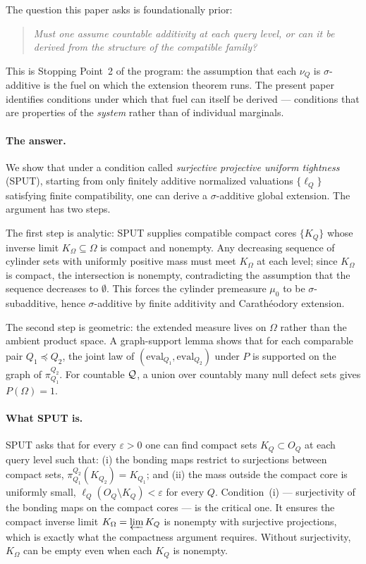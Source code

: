 The question this paper asks is foundationally prior:

\begin{quote}
\emph{Must one assume countable additivity at each query level, or
can it be derived from the structure of the compatible family?}
\end{quote}

This is Stopping Point~2 of the program: the assumption that each
$\nu_Q$ is $\sigma$-additive is the fuel on which the extension
theorem runs.  The present paper identifies conditions under which
that fuel can itself be derived --- conditions that are properties
of the \emph{system} rather than of individual marginals.

\paragraph{The answer.}
We show that under a condition called \emph{surjective projective
uniform tightness} (SPUT), starting from only finitely additive
normalized valuations $\{\ell_Q\}$ satisfying finite compatibility,
one can derive a $\sigma$-additive global extension.  The argument has
two steps.

The first step is analytic: SPUT supplies compatible compact cores
$\{K_Q\}$ whose inverse limit $K_\Omega \subseteq \Omega$ is compact
and nonempty.  Any decreasing sequence of cylinder sets with uniformly
positive mass must meet $K_\Omega$ at each level; since
$K_\Omega$ is compact, the intersection is nonempty, contradicting
the assumption that the sequence decreases to $\emptyset$.  This
forces the cylinder premeasure $\mu_0$ to be $\sigma$-subadditive,
hence $\sigma$-additive by finite additivity and Carath\'eodory
extension.

The second step is geometric: the extended measure lives on $\Omega$
rather than the ambient product space.  A graph-support lemma shows
that for each comparable pair $Q_1 \preceq Q_2$, the joint law of
$(\mathrm{eval}_{Q_1}, \mathrm{eval}_{Q_2})$ under $P$ is
supported on the graph of $\pi^{Q_2}_{Q_1}$.  For countable
$\mathcal{Q}$, a union over countably many null defect sets gives
$P(\Omega) = 1$.

\paragraph{What SPUT is.}
SPUT asks that for every $\varepsilon > 0$ one can find compact sets
$K_Q \subset O_Q$ at each query level such that: (i) the
bonding maps restrict to surjections between compact sets,
$\pi^{Q_2}_{Q_1}(K_{Q_2}) = K_{Q_1}$; and (ii) the mass outside
the compact core is uniformly small, $\ell_Q(O_Q \setminus K_Q) <
\varepsilon$ for every $Q$.  Condition~(i) --- surjectivity of the
bonding maps on the compact cores --- is the critical one.  It ensures
the compact inverse limit $K_\Omega = \varprojlim K_Q$ is nonempty
with surjective projections, which is exactly what the compactness
argument requires.  Without surjectivity, $K_\Omega$ can be empty
even when each $K_Q$ is nonempty.

